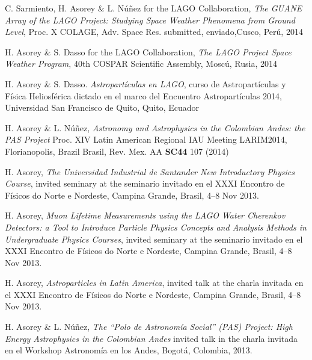 \begin{etaremune}
\item {}C. Sarmiento, H. Asorey \& L. Núñez for the LAGO Collaboration, {\emph{The GUANE Array of the LAGO Project: Studying Space Weather Phenomena from Ground Level}}, \en Proc. X COLAGE, Adv. Space Res. \ifeng submitted, \else enviado,\fi  Cusco, Perú, 2014

\item {}H. Asorey \& S. Dasso for the LAGO Collaboration, {\emph{The LAGO Project Space Weather Program}}, \en 40th COSPAR Scientific Assembly, Moscú, Rusia, 2014

\item {}H. Asorey \& S. Dasso. {\emph{Astropartículas en LAGO}}, curso de Astropartículas y Física Heliosférica dictado en el marco del Encuentro Astropartículas 2014, Universidad San Francisco de Quito, Quito, Ecuador

\item {}H. Asorey \& L. Núñez, {\emph{Astronomy and Astrophysics in the Colombian Andes: the PAS Project}} \en Proc. XIV Latin American Regional IAU Meeting LARIM2014, Florianopolis, \ifeng Brazil \else Brasil\fi, Rev. Mex. AA {\bf{SC44}} 107 (2014)

\item {} H. Asorey, {\emph{The Universidad Industrial de Santander New Introductory Physics Course}}, 
\ifeng
invited seminary at the
\else
seminario invitado en el
\fi
XXXI Encontro de Físicos do Norte e Nordeste, Campina Grande, Brasil, 4--8 Nov 2013.

\item {} H. Asorey, {\emph{Muon Lifetime Measurements using the LAGO Water Cherenkov Detectors: a Tool to Introduce Particle Physics Concepts and Analysis Methods in Undergraduate Physics Courses}}, 
\ifeng
invited seminary at the
\else
seminario invitado en el
\fi
XXXI Encontro de Físicos do Norte e Nordeste, Campina Grande, Brasil, 4--8 Nov 2013.

\item {} H. Asorey, {\emph{Astroparticles in Latin America}}, 
\ifeng
invited talk at the
\else
charla invitada en el 
\fi
XXXI Encontro de Físicos do Norte e Nordeste, Campina Grande, Brasil, 4--8 Nov 2013.

\item {}H. Asorey \& L. Núñez, {\emph{The ``Polo de Astronomía Social'' (PAS) Project: High Energy Astrophysics in the Colombian Andes}} \ifeng invited talk in the \else charla invitada en el \fi Workshop Astronomía en los Andes, Bogotá, Colombia, 2013.
    

\end{etaremune}

